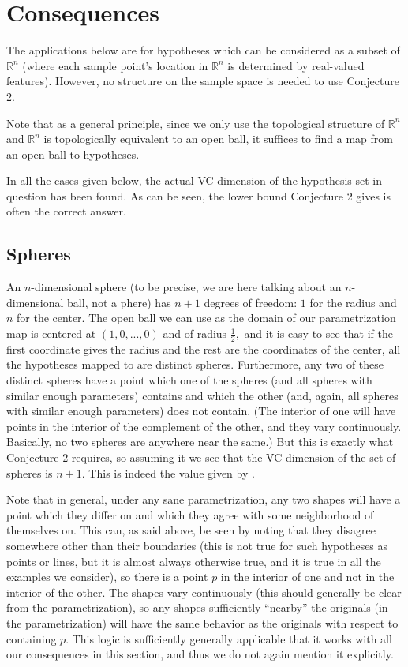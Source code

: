 \documentclass[12pt]{amsart}
\newcommand{\0}{\mat{0}}
\newcommand{\1}{\mathds{1}}
\begin{document}
\section{Consequences}
The applications below are for hypotheses which can be considered as a subset of $\mathbb{R}^n$ (where each sample point's location in $\mathbb{R}^n$ is determined by real-valued features). However, no structure on the sample space is needed to use Conjecture 2.

Note that as a general principle, since we only use the topological structure of $\mathbb{R}^n$ and $\mathbb{R}^n$ is topologically equivalent to an open ball, it suffices to find a map from an open ball to hypotheses.

In all the cases given below, the actual VC-dimension of the hypothesis set in question has been found. As can be seen, the lower bound Conjecture 2 gives is often the correct answer.

\subsection{Spheres}

An $n$-dimensional sphere (to be precise, we are here talking about an $n$-dimensional ball, not a phere) has $n + 1$ degrees of freedom: $1$ for the radius and $n$ for the center. The open ball we can use as the domain of our parametrization map is centered at $(1, 0, ..., 0)$ and of radius $\frac{1}{2},$ and it is easy to see that if the first coordinate gives the radius and the rest are the coordinates of the center, all the hypotheses mapped to are distinct spheres. Furthermore, any two of these distinct spheres have a point which one of the spheres (and all spheres with similar enough parameters) contains and which the other (and, again, all spheres with similar enough parameters) does not contain. (The interior of one will have points in the interior of the complement of the other, and they vary continuously. Basically, no two spheres are anywhere near the same.) But this is exactly what Conjecture 2 requires, so assuming it we see that the VC-dimension of the set of spheres is $n + 1.$ This is indeed the value given by \citep{spheres}.

Note that in general, under any sane parametrization, any two shapes will have a point which they differ on and which they agree with some neighborhood of themselves on. This can, as said above, be seen by noting that they disagree somewhere other than their boundaries (this is not true for such hypotheses as points or lines, but it is almost always otherwise true, and it is true in all the examples we consider), so there is a point $p$ in the interior of one and not in the interior of the other. The shapes vary continuously (this should generally be clear from the parametrization), so any shapes sufficiently ``nearby'' the originals (in the parametrization) will have the same behavior as the originals with respect to containing $p.$ This logic is sufficiently generally applicable that it works with all our consequences in this section, and thus we do not again mention it explicitly.
\end{document}
